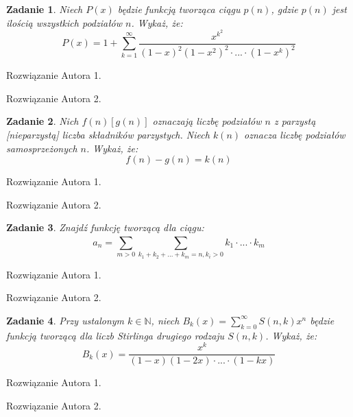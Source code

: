 \documentclass{mwart}
\newcommand{\N}{\mathbb{N}}
\newtheorem{zad}{Zadanie}[section]
\begin{document}
\begin{zad}
    Niech $P(x)$ będzie funkcją tworząca ciągu $p(n)$, gdzie $p(n)$ jest ilością wszystkich podziałów $n$. Wykaż, że:
    \[P(x) = 1 + \sum_{k=1}^{\infty}\frac{x^{k^2}}{(1-x)^2(1-x^2)^2\cdot ... \cdot (1-x^k)^2}\]
\end{zad}
\begin{mdframed}
    Rozwiązanie Autora 1.
\end{mdframed}
\begin{mdframed}
    Rozwiązanie Autora 2.
\end{mdframed}

\begin{zad}
    Nich $f(n)[g(n)]$ oznaczają liczbę podziałów $n$ z parzystą [nieparzystą] liczba składników parzystych. Niech $k(n)$ oznacza liczbę podziałów samosprzeżonych $n$. Wykaż, że:
    \[f(n) - g(n) = k(n)\]
\end{zad}
\begin{mdframed}
    Rozwiązanie Autora 1.
\end{mdframed}
\begin{mdframed}
    Rozwiązanie Autora 2.
\end{mdframed}


\begin{zad}
    Znajdź funkcję tworzącą dla ciągu:
    \[a_n = \sum_{m>0}^{}\sum_{k_1+k_2+...+k_m = n, k_i>0}^{}k_1 \cdot ... \cdot k_m\]
\end{zad}
\begin{mdframed}
    Rozwiązanie Autora 1.
\end{mdframed}
\begin{mdframed}
    Rozwiązanie Autora 2.
\end{mdframed}

\begin{zad}
    Przy ustalonym $k \in \N$, niech $B_k(x) = \sum_{k=0}^{\infty}S(n, k)x^n$ będzie funkcją
    tworzącą dla liczb Stirlinga drugiego rodzaju $S(n, k)$. Wykaż, że:
    \[B_k(x) = \frac{x^k}{(1-x)(1-2x) \cdot ... \cdot (1-kx)}\]
\end{zad}
\begin{mdframed}
    Rozwiązanie Autora 1.
\end{mdframed}
\begin{mdframed}
    Rozwiązanie Autora 2.
\end{mdframed}
\end{document}
